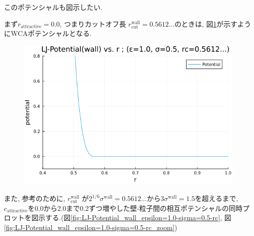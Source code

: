 \documentclass[dvipdfmx]{jsarticle}
\numberwithin{equation}{subsection}
\begin{document}
このポテンシャルも図示したい. 

まず$r_{\text{attractive}} =0.0$, つまりカットオフ長 $r_{\text{cut}}^{\text{wall}}=0.5612\dots$のときは, 図\ref{fig:LJ-potential(wall)rc=0.5612}が示すようにWCAポテンシャルとなる.

\begin{figure}[H]
  \centering
  \caption{}
  \label{fig:LJ-potential(wall)rc=0.5612}
  \includegraphics[scale=0.7]{image/LJ-Potential_wall_epsilon=1.0-sigma=0.5-rc=0.56.png}
\end{figure}

また, 参考のために, $r_{\text{cut}}^{\text{wall}}$ が$2^{1/6}\sigma^{\text{wall}}=0.5612\dots$から$3\sigma^{\text{wall}}=1.5$を超えるまで, $c_{\text{attractive}}$を0.0から2.0まで0.2ずつ増やした壁-粒子間の相互ポテンシャルの同時プロットを図示する.(図\ref{fig:LJ-Potential_wall_epsilon=1.0-sigma=0.5-rc}, 図\ref{fig:LJ-Potential_wall_epsilon=1.0-sigma=0.5-rc_zoom})
\end{document}
